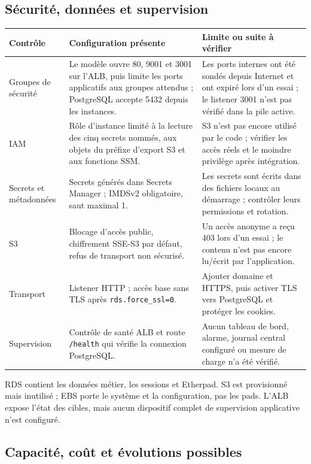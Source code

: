 \subsection{Sécurité, données et supervision}

\begin{tabularx}{\linewidth}{@{}L{36mm}L{50mm}Y@{}}
\toprule Contrôle & Configuration présente & Limite ou suite à vérifier \\
\midrule
Groupes de sécurité & Le modèle ouvre 80, 9001 et 3001 sur l'ALB, puis limite les ports applicatifs aux groupes attendus ; PostgreSQL accepte 5432 depuis les instances. & Les ports internes ont été sondés depuis Internet et ont expiré lors d'un essai ; le listener 3001 n'est pas vérifié dans la pile active. \\
IAM & Rôle d'instance limité à la lecture des cinq secrets nommés, aux objets du préfixe d'export S3 et aux fonctions SSM. & S3 n'est pas encore utilisé par le code ; vérifier les accès réels et le moindre privilège après intégration. \\
Secrets et métadonnées & Secrets générés dans Secrets Manager ; IMDSv2 obligatoire, saut maximal 1. & Les secrets sont écrits dans des fichiers locaux au démarrage ; contrôler leurs permissions et rotation. \\
S3 & Blocage d'accès public, chiffrement SSE-S3 par défaut, refus de transport non sécurisé. & Un accès anonyme a reçu 403 lors d'un essai ; le contenu n'est pas encore lu/écrit par l'application. \\
Transport & Listener HTTP ; accès base sans TLS après \texttt{rds.force\_ssl=0}. & Ajouter domaine et HTTPS, puis activer TLS vers PostgreSQL et protéger les cookies. \\
Supervision & Contrôle de santé ALB et route \texttt{/health} qui vérifie la connexion PostgreSQL. & Aucun tableau de bord, alarme, journal central configuré ou mesure de charge n'a été vérifié. \\
\bottomrule
\end{tabularx}

RDS contient les données métier, les sessions et Etherpad. S3 est provisionné mais inutilisé ; EBS porte le système et la configuration, pas les pads. L'ALB expose l'état des cibles, mais aucun dispositif complet de supervision applicative n'est configuré.

\subsection{Capacité, coût et évolutions possibles}


